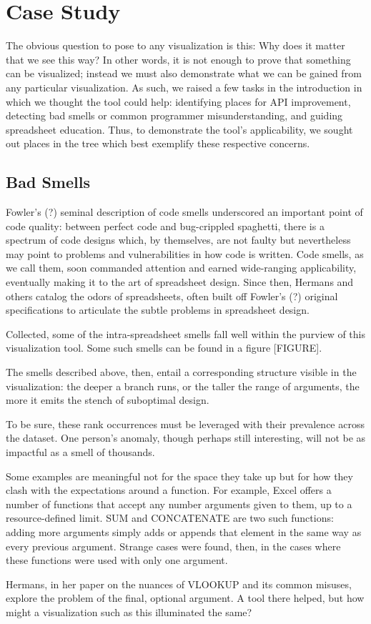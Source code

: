 \documentclass[conference]{IEEEtran}
\begin{document}
\section{Case Study}
The obvious question to pose to any visualization is this: Why does it matter that we see this way? In other words, it is not enough to prove that something can be visualized; instead we must also demonstrate what we can be gained from any particular visualization. As such, we raised a few tasks in the introduction in which we thought the tool could help: identifying places for API improvement, detecting bad smells or common programmer misunderstanding, and guiding spreadsheet education. Thus, to demonstrate the tool's applicability, we sought out places in the tree which best exemplify these respective concerns.

\subsection{Bad Smells}
Fowler's (?) seminal description of code smells underscored
an important point of code quality: between perfect code and 
bug-crippled spaghetti,  there is a spectrum of code designs 
which, by themselves, are not faulty but nevertheless may
point to problems and vulnerabilities in how code is written.
Code smells, as we call them, soon commanded attention and earned wide-ranging 
applicability, eventually making it to the art of spreadsheet design.
Since then, Hermans and others catalog the odors of spreadsheets, 
often built off Fowler's (?) original specifications to articulate
the subtle problems in spreadsheet design. \par 
Collected, some of the intra-spreadsheet smells fall well within the
purview of this visualization tool. Some such smells can be found
in a figure [FIGURE]. \par 
The smells described above, then, entail a corresponding structure
visible in the visualization: the deeper a branch runs, or the
taller the range of arguments, the more it emits the stench of suboptimal
design. \par 
To be sure, these rank occurrences must be leveraged with their prevalence
across the dataset. One person's anomaly, though perhaps still interesting,
will not be as impactful as a smell of thousands. \par
Some examples are meaningful not for the space they take up but for how
they clash with the expectations around a function. For example, Excel
offers a number of functions that accept any number arguments given to 
them, up to a resource-defined limit. SUM and CONCATENATE are two such functions:
adding more arguments simply adds or appends that element in the same way
as every previous argument. Strange cases were found, then, in the cases where
these functions were used with only one argument. \par
Hermans, in her paper on the nuances of VLOOKUP and its common misuses, explore
the problem of the final, optional argument. A tool there helped, but how might
a visualization such as this illuminated the same?
\end{document}
